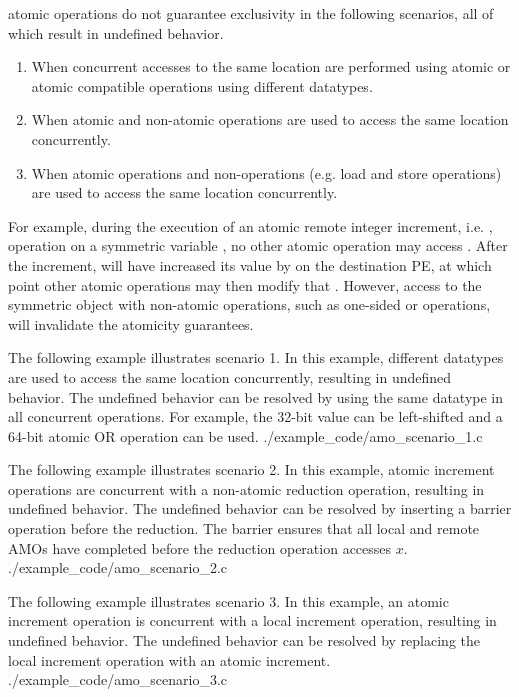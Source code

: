 \openshmem atomic operations do not guarantee exclusivity in the following
scenarios, all of which result in undefined behavior.
\begin{enumerate}
    \item When concurrent accesses to the same location are performed using
        \openshmem atomic or atomic compatible operations using different
        datatypes.
    \item When atomic and non-atomic \openshmem operations are used to access
        the same location concurrently.
    \item When \openshmem atomic operations and non-\openshmem operations (e.g.
        load and store operations) are used to access the same location
        concurrently.
\end{enumerate}
For example, during the execution of an atomic remote integer increment, i.e. ,
operation on a symmetric variable , no other \openshmem atomic operation
may access .  After the increment,  will have increased its value
by  on the destination \ac{PE}, at which point other atomic operations
may then modify that .  However, access to the symmetric object 
with non-atomic operations, such as one-sided  or  operations,
will invalidate the atomicity guarantees.

\cexample
    {The following \CorCpp example illustrates scenario 1.  In this example,
    different datatypes are used to access the same location concurrently,
    resulting in undefined behavior.  The undefined behavior can be resolved by
    using the same datatype in all concurrent operations.  For example, the
    32-bit value can be left-shifted and a 64-bit atomic OR operation can be
    used.}
    {./example_code/amo_scenario_1.c}

\cexample
    {The following \CorCpp example illustrates scenario 2.  In this example,
    atomic increment operations are concurrent with a non-atomic reduction
    operation, resulting in undefined behavior.  The undefined behavior can be
    resolved by inserting a barrier operation before the reduction.  The
    barrier ensures that all local and remote AMOs have completed before the
    reduction operation accesses $x$.}
    {./example_code/amo_scenario_2.c}

\cexample
    {The following \CorCpp example illustrates scenario 3.  In this example, an
    \openshmem atomic increment operation is concurrent with a local increment
    operation, resulting in undefined behavior.  The undefined behavior can be
    resolved by replacing the local increment operation with an \openshmem
    atomic increment.}
    {./example_code/amo_scenario_3.c}
